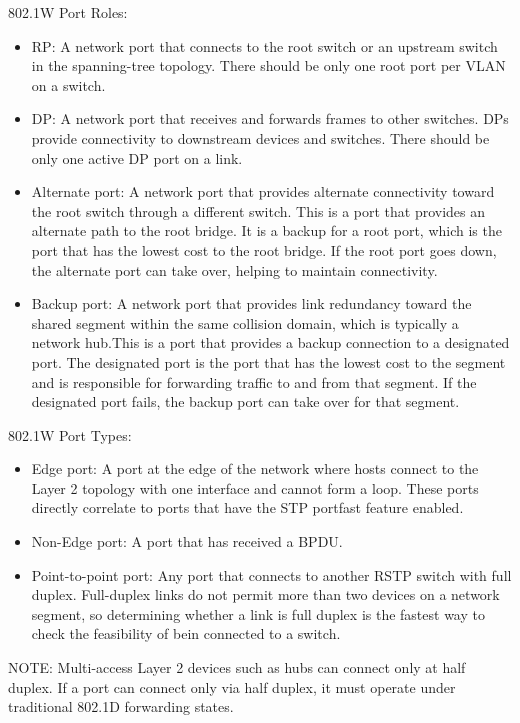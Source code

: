 \documentclass{article}
\begin{document}
802.1W Port Roles:
\begin{itemize}
\item RP: A network port that connects to the root switch or an upstream switch in the spanning-tree topology. There should be only one root port per VLAN on a switch.
\item DP: A network port that receives and forwards frames to other switches. DPs provide connectivity to downstream devices and switches. There should be only one active DP port on a link.
\item Alternate port: A network port that provides alternate connectivity toward the root switch through a different switch. This is a port that provides an alternate path to the root bridge. It is a backup for a root port, which is the port that has the lowest cost to the root bridge. If the root port goes down, the alternate port can take over, helping to maintain connectivity.
\item Backup port: A network port that provides link redundancy toward the shared segment within the same collision domain, which is typically a network hub.This is a port that provides a backup connection to a designated port. The designated port is the port that has the lowest cost to the segment and is responsible for forwarding traffic to and from that segment. If the designated port fails, the backup port can take over for that segment.
\end{itemize}

802.1W Port Types:
\begin{itemize}
\item Edge port: A port at the edge of the network where hosts connect to the Layer 2 topology with one interface and cannot form a loop. These ports directly correlate to ports that have the STP portfast feature enabled.
\item Non-Edge port: A port that has received a BPDU.
\item Point-to-point port: Any port that connects to another RSTP switch with full duplex. Full-duplex links do not permit more than two devices on a network segment, so determining whether a link is full duplex is the fastest way to check the feasibility of bein connected to a switch.
\end{itemize}	

\noindent NOTE: Multi-access Layer 2 devices such as hubs can connect only at half duplex. If a port can connect only via half duplex, it must operate under traditional 802.1D forwarding states.\\
\end{document}
